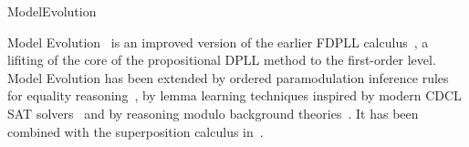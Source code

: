 \begin{entry}{ModelEvolution}
\begin{history}
Model Evolution~\cite{Baumgartner:Tinelli:ModelEvolutionCalculus:CADE:2003}
is an improved version of the earlier FDPLL
calculus~\cite{Baumgartner:FDPLL:CADE:00}, a lifiting of the core of the
propositional DPLL method to the first-order level. Model Evolution has been extended by
ordered paramodulation inference rules for equality
reasoning~\cite{Baumgartner:Tinelli:ModelEvolutionCalculusEquality:CADE:2005}, by lemma
learning techniques inspired by modern CDCL SAT
solvers~\cite{Baumgartner:etal:ModelEvolutionLearning:LPAR:2006} and by 
reasoning modulo background
theories~\cite{Baumgartner:Fuchs:Tinelli:MELIA:LPAR:2008,Baumgartner:Tinelli:MEET:CADE:2011}. 
It has been combined with the superposition calculus in~\cite{Baumgartner:Waldmann:MESUP:CADE:2009}.
\end{history}




%
%
%
%
%
%
% 
%












\end{entry}
